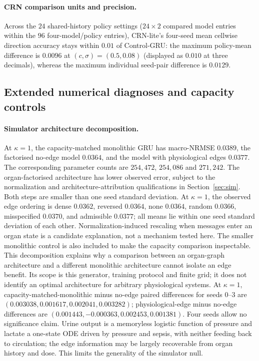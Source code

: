 \paragraph{CRN comparison units and precision.}\label{app:crncomparisonunits}
Across the $24$ shared-history policy settings ($24\times2$ compared model entries within the $96$ four-model/policy entries), CRN-lite's four-seed mean cellwise direction accuracy stays within $0.01$ of Control-GRU: the maximum policy-mean difference is $0.0096$ at $(c,\sigma)=(0.5,0.08)$ (displayed as $0.010$ at three decimals), whereas the maximum individual seed-pair difference is $0.0129$.

\subsection{Extended numerical diagnoses and capacity controls}
\paragraph{Simulator architecture decomposition.}\label{app:decompositiondetail}
At $\kappa=1$, the capacity-matched monolithic GRU has macro-NRMSE $0.0389$, the factorised no-edge model $0.0364$, and the model with physiological edges $0.0377$. The corresponding parameter counts are $254{,}472$, $254{,}086$ and $271{,}242$. The organ-factorised architecture has lower observed error, subject to the normalization and architecture-attribution qualifications in Section~\ref{sec:sim}. Both steps are smaller than one seed standard deviation. At $\kappa=1$, the observed edge ordering is dense $0.0362$, reversed $0.0364$, none $0.0364$, random $0.0366$, misspecified $0.0370$, and admissible $0.0377$; all means lie within one seed standard deviation of each other. Normalization-induced rescaling when messages enter an organ state is a candidate explanation, not a mechanism tested here. The smaller monolithic control is also included to make the capacity comparison inspectable. This decomposition explains why a comparison between an organ-graph architecture and a different monolithic architecture cannot isolate an edge benefit. Its scope is this generator, training protocol and finite grid; it does not identify an optimal architecture for arbitrary physiological systems. At $\kappa=1$, capacity-matched-monolithic minus no-edge paired differences for seeds $0$--$3$ are $(0.003038,0.001617,0.002041,0.003282)$; physiological-edge minus no-edge differences are $(0.001443,-0.000363,0.002453,0.001381)$. Four seeds allow no significance claim. Urine output is a memoryless logistic function of pressure and lactate a one-state ODE driven by pressure and sepsis, with neither feeding back to circulation; the edge information may be largely recoverable from organ history and dose. This limits the generality of the simulator null.


